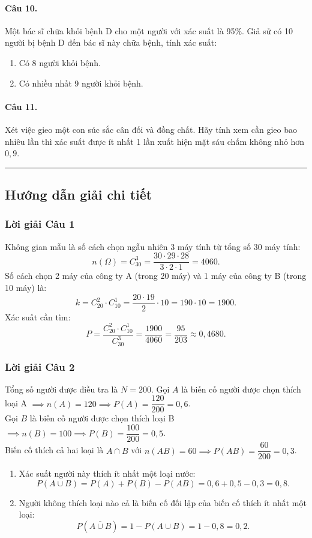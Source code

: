 \paragraph{Câu 10.} Một bác sĩ chữa khỏi bệnh D cho một người với xác suất là 95\%. Giả sử có 10 người bị bệnh D đến bác sĩ này chữa bệnh, tính xác suất:
\begin{enumerate}[label=\alph*)]
    \item Có 8 người khỏi bệnh.
    \item Có nhiều nhất 9 người khỏi bệnh.
\end{enumerate}

\paragraph{Câu 11.} Xét việc gieo một con súc sắc cân đối và đồng chất. Hãy tính xem cần gieo bao nhiêu lần thì xác suất được ít nhất 1 lần xuất hiện mặt sáu chấm không nhỏ hơn $0{,}9$.

\vspace{1em}
\hrule
\vspace{1.5em}

\subsection{Hướng dẫn giải chi tiết}

\subsubsection*{Lời giải Câu 1}
Không gian mẫu là số cách chọn ngẫu nhiên 3 máy tính từ tổng số 30 máy tính:
\[
n(\Omega) = C_{30}^3 = \frac{30 \cdot 29 \cdot 28}{3 \cdot 2 \cdot 1} = 4060.
\]
Số cách chọn 2 máy của công ty A (trong 20 máy) và 1 máy của công ty B (trong 10 máy) là:
\[
k = C_{20}^2 \cdot C_{10}^1 = \frac{20 \cdot 19}{2} \cdot 10 = 190 \cdot 10 = 1900.
\]
Xác suất cần tìm:
\[
P = \frac{C_{20}^2 \cdot C_{10}^1}{C_{30}^3} = \frac{1900}{4060} = \frac{95}{203} \approx 0{,}4680.
\]

\subsubsection*{Lời giải Câu 2}
Tổng số người được điều tra là $N = 200$.
Gọi $A$ là biến cố người được chọn thích loại A $\implies n(A) = 120 \implies P(A) = \dfrac{120}{200} = 0{,}6$.\\
Gọi $B$ là biến cố người được chọn thích loại B $\implies n(B) = 100 \implies P(B) = \dfrac{100}{200} = 0{,}5$.\\
Biến cố thích cả hai loại là $A \cap B$ với $n(AB) = 60 \implies P(AB) = \dfrac{60}{200} = 0{,}3$.
\begin{enumerate}[label=\arabic*.]
    \item Xác suất người này thích ít nhất một loại nước:
    \[
    P(A \cup B) = P(A) + P(B) - P(AB) = 0{,}6 + 0{,}5 - 0{,}3 = 0{,}8.
    \]
    \item Người không thích loại nào cả là biến cố đối lập của biến cố thích ít nhất một loại:
    \[
    P(\overline{A \cup B}) = 1 - P(A \cup B) = 1 - 0{,}8 = 0{,}2.
    \]
\end{enumerate}

